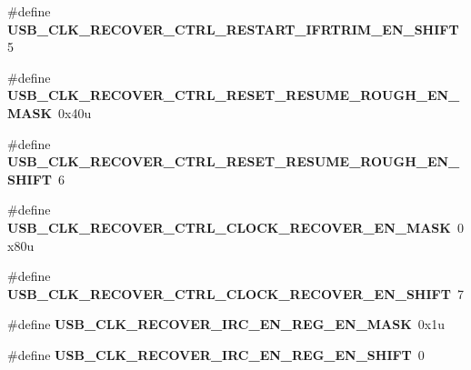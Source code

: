 \begin{DoxyCompactItemize}
\item 
\#define {\bfseries U\+S\+B\+\_\+\+C\+L\+K\+\_\+\+R\+E\+C\+O\+V\+E\+R\+\_\+\+C\+T\+R\+L\+\_\+\+R\+E\+S\+T\+A\+R\+T\+\_\+\+I\+F\+R\+T\+R\+I\+M\+\_\+\+E\+N\+\_\+\+S\+H\+I\+FT}~5\hypertarget{group__USB__Register__Masks_gafd08f3eb421e7db973f9940a2111f0a7}{}\label{group__USB__Register__Masks_gafd08f3eb421e7db973f9940a2111f0a7}

\item 
\#define {\bfseries U\+S\+B\+\_\+\+C\+L\+K\+\_\+\+R\+E\+C\+O\+V\+E\+R\+\_\+\+C\+T\+R\+L\+\_\+\+R\+E\+S\+E\+T\+\_\+\+R\+E\+S\+U\+M\+E\+\_\+\+R\+O\+U\+G\+H\+\_\+\+E\+N\+\_\+\+M\+A\+SK}~0x40u\hypertarget{group__USB__Register__Masks_gae30340de1a58627aeb4aac99ba1b0418}{}\label{group__USB__Register__Masks_gae30340de1a58627aeb4aac99ba1b0418}

\item 
\#define {\bfseries U\+S\+B\+\_\+\+C\+L\+K\+\_\+\+R\+E\+C\+O\+V\+E\+R\+\_\+\+C\+T\+R\+L\+\_\+\+R\+E\+S\+E\+T\+\_\+\+R\+E\+S\+U\+M\+E\+\_\+\+R\+O\+U\+G\+H\+\_\+\+E\+N\+\_\+\+S\+H\+I\+FT}~6\hypertarget{group__USB__Register__Masks_ga30a7d01d4ba637c538f8dc499436b81e}{}\label{group__USB__Register__Masks_ga30a7d01d4ba637c538f8dc499436b81e}

\item 
\#define {\bfseries U\+S\+B\+\_\+\+C\+L\+K\+\_\+\+R\+E\+C\+O\+V\+E\+R\+\_\+\+C\+T\+R\+L\+\_\+\+C\+L\+O\+C\+K\+\_\+\+R\+E\+C\+O\+V\+E\+R\+\_\+\+E\+N\+\_\+\+M\+A\+SK}~0x80u\hypertarget{group__USB__Register__Masks_gafea91b9d1976f9212d7caf1ae1d6e20d}{}\label{group__USB__Register__Masks_gafea91b9d1976f9212d7caf1ae1d6e20d}

\item 
\#define {\bfseries U\+S\+B\+\_\+\+C\+L\+K\+\_\+\+R\+E\+C\+O\+V\+E\+R\+\_\+\+C\+T\+R\+L\+\_\+\+C\+L\+O\+C\+K\+\_\+\+R\+E\+C\+O\+V\+E\+R\+\_\+\+E\+N\+\_\+\+S\+H\+I\+FT}~7\hypertarget{group__USB__Register__Masks_ga0be4a3f8e9d2306f64ebe6b47216524d}{}\label{group__USB__Register__Masks_ga0be4a3f8e9d2306f64ebe6b47216524d}

\item 
\#define {\bfseries U\+S\+B\+\_\+\+C\+L\+K\+\_\+\+R\+E\+C\+O\+V\+E\+R\+\_\+\+I\+R\+C\+\_\+\+E\+N\+\_\+\+R\+E\+G\+\_\+\+E\+N\+\_\+\+M\+A\+SK}~0x1u\hypertarget{group__USB__Register__Masks_ga7e948ea51eeee58403c13f4c040ddb55}{}\label{group__USB__Register__Masks_ga7e948ea51eeee58403c13f4c040ddb55}

\item 
\#define {\bfseries U\+S\+B\+\_\+\+C\+L\+K\+\_\+\+R\+E\+C\+O\+V\+E\+R\+\_\+\+I\+R\+C\+\_\+\+E\+N\+\_\+\+R\+E\+G\+\_\+\+E\+N\+\_\+\+S\+H\+I\+FT}~0\hypertarget{group__USB__Register__Masks_ga988c7c957c1cb5e0b15d837f929da78b}{}\label{group__USB__Register__Masks_ga988c7c957c1cb5e0b15d837f929da78b}


\end{DoxyCompactItemize}

